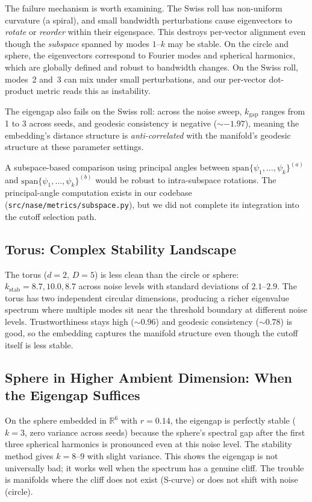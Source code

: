 \documentclass{article}
\begin{document}
The failure mechanism is worth examining. The Swiss roll has non-uniform curvature (a spiral), and small bandwidth perturbations cause eigenvectors to \emph{rotate} or \emph{reorder} within their eigenspace. This destroys per-vector alignment even though the \emph{subspace} spanned by modes $1$--$k$ may be stable. On the circle and sphere, the eigenvectors correspond to Fourier modes and spherical harmonics, which are globally defined and robust to bandwidth changes. On the Swiss roll, modes~2 and~3 can mix under small perturbations, and our per-vector dot-product metric reads this as instability.

The eigengap also fails on the Swiss roll: across the noise sweep, $k_{\text{gap}}$ ranges from 1 to 3 across seeds, and geodesic consistency is negative (${\sim}{-}1.97$), meaning the embedding's distance structure is \emph{anti-correlated} with the manifold's geodesic structure at these parameter settings.

A subspace-based comparison using principal angles between $\mathrm{span}\{\psi_1, \ldots, \psi_k\}^{(a)}$ and $\mathrm{span}\{\psi_1, \ldots, \psi_k\}^{(b)}$ would be robust to intra-subspace rotations. The principal-angle computation exists in our codebase (\texttt{src/nase/metrics/subspace.py}), but we did not complete its integration into the cutoff selection path.

\subsection{Torus: Complex Stability Landscape}

The torus ($d = 2$, $D = 5$) is less clean than the circle or sphere: $k_{\text{stab}} = 8.7, 10.0, 8.7$ across noise levels with standard deviations of $2.1$--$2.9$. The torus has two independent circular dimensions, producing a richer eigenvalue spectrum where multiple modes sit near the threshold boundary at different noise levels. Trustworthiness stays high (${\sim}0.96$) and geodesic consistency (${\sim}0.78$) is good, so the embedding captures the manifold structure even though the cutoff itself is less stable.

\subsection{Sphere in Higher Ambient Dimension: When the Eigengap Suffices}

On the sphere embedded in $\mathbb{R}^6$ with $r = 0.14$, the eigengap is perfectly stable ($k = 3$, zero variance across seeds) because the sphere's spectral gap after the first three spherical harmonics is pronounced even at this noise level. The stability method gives $k = 8$--$9$ with slight variance. This shows the eigengap is not universally bad; it works well when the spectrum has a genuine cliff. The trouble is manifolds where the cliff does not exist (S-curve) or does not shift with noise (circle).
\end{document}
